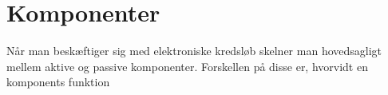 \section{Komponenter}
\label{Komponenter}
Når man beskæftiger sig med elektroniske kredsløb skelner man hovedsagligt mellem aktive og passive komponenter. Forskellen på disse er, hvorvidt en komponents funktion